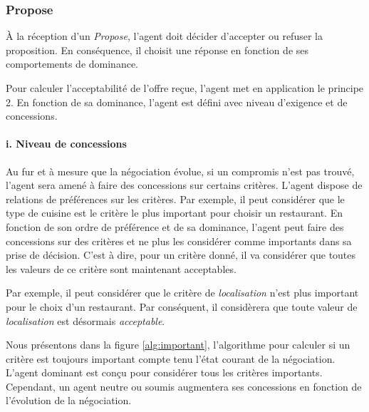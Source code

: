 	
%	
	
	
	
	 
	\subsubsection{Propose}
	À la réception d'un \emph{Propose}, l'agent doit décider d'accepter ou refuser la proposition. En conséquence, il choisit une réponse en fonction de ses comportements de dominance.
	
	Pour calculer l'acceptabilité de l'offre reçue, l'agent met en application le principe 2. En fonction de sa dominance, l'agent est défini avec niveau d'exigence et de concessions. 
	
	\paragraph{i. Niveau de concessions}
	
	Au fur et à mesure que la négociation évolue, si un compromis n'est pas trouvé, l'agent sera amené à faire des concessions sur certains critères. L'agent dispose de relations de préférences sur les critères. Par exemple, il peut considérer que le type de cuisine est le critère le plus important pour choisir un restaurant. En fonction de son ordre de préférence et de sa dominance, l'agent peut faire des concessions sur des critères et ne plus les considérer comme importants dans sa prise de décision. C'est à dire, pour un critère donné, il va considérer que toutes les valeurs de ce critère sont maintenant acceptables. 
	
	Par exemple, il peut considérer que le critère de \emph{localisation} n'est plus important pour le choix d'un restaurant. Par conséquent, il considèrera que toute valeur de \emph{localisation} est désormais \emph{acceptable}.
	
	Nous présentons dans la figure \ref{alg:important}, l'algorithme pour calculer si un critère est toujours important compte tenu l'état courant de la négociation. L'agent dominant est conçu pour considérer tous les critères importants. Cependant, un agent neutre ou soumis augmentera ses concessions en fonction de l'évolution de la négociation. 


